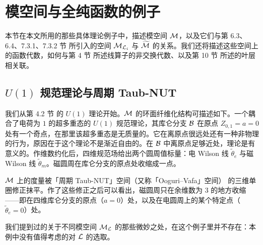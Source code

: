 
\section{模空间与全纯函数的例子}
\label{sec:Examples-of-M}

本节在本文所用的那些具体理论例子中，描述模空间 $\mathcal{M}$，以及它们与第 6.3、6.4、7.3.1、7.3.2 节%
所引入的空间 $\mathcal{M}_{\mathcal{L}_i}$ 与 $\widetilde{\mathcal{M}}$ 的关系。我们还将描述这些空间上的函数代数，如何与第 4 节%
所述线算子的非交换代数、以及第 10 节%
所述的叶层相关联。

\subsection{$U(1)$ 规范理论与周期 Taub-NUT}

我们从第 4.2 节%
的 $U(1)$ 理论开始。$\mathcal{M}$ 的环面纤维化结构可描述如下。一个耦合了电荷为 $1$ 的超多重态的 $U(1)$ 规范理论，其库仑分支 $\mathcal{B}$ 在原点 $Z_{0,1}=a=0$ 处有一个奇点，在那里该超多重态是无质量的。它在离原点很远处还有一种非物理的行为，原因在于这个理论不是渐近自由的。在 $\mathcal{B}$ 中离原点足够近处，理论是有意义的。作维数约化后，四维规范场给出两个圆周值标量：电 Wilson 线 $\tilde\theta_e$ 与磁 Wilson 线 $\tilde\theta_m$。磁圆周在库仑分支的原点处收缩成一点。

$\mathcal{M}$ 上的度量被「周期 Taub-NUT」空间（又称「Ooguri–Vafa」空间）\cite{Ooguri:1996me,Seiberg:1996ns} 的三维单圈修正抹平。作了这些修正之后可以看出，磁圆周只在余维数为 3 的地方收缩——即在四维库仑分支的原点（$a=0$）处，以及在电圆周上的某个特定点（$\tilde\theta_e=0$）处。

我们提到过的关于不同模空间 $\mathcal{M}_{\mathcal{L}}$ 的那些微妙之处，在这个例子里并不存在：本例中没有值得考虑的对 $\mathcal{L}$ 的选取。

